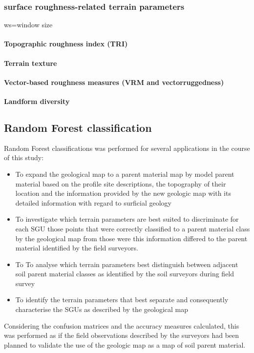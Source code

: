 \documentclass[preprint,12pt,authoryear]{elsarticle}
\begin{document}
\subsubsection{surface roughness-related terrain parameters}
ws=window size
\paragraph{Topographic roughness index (TRI)}  \citep{Riley1999}
\paragraph{Terrain texture}
\paragraph{Vector-based roughness measures (VRM and vectorruggedness)}
\paragraph{Landform diversity} 

\subsection{Random Forest classification }

Random Forest classifications was performed for several applications in the course of this study:
\begin{itemize}
\item To expand the geological map to a parent material map by model parent material based on the profile site descriptions, the topography of their location and the information provided by the new geologic map with its detailed information with regard to surficial geology
\item To investigate which terrain parameters are best suited to discriminate for each SGU those points that were correctly classified to a parent material class by the geological map from those were this information differed to the parent material identified by the field surveyors.
\item To To analyse which terrain parameters best distinguish between adjacent soil parent material classes as identified by the soil surveyors during field survey
\item To identify the terrain parameters that best separate and consequently characterise the SGUs as described by the geological map
\end{itemize}
Considering the confusion matrices and the accuracy measures calculated, this was performed as if the field observations described by the surveyors had been planned to validate the use of the geologic map as a map of soil parent material.
\end{document}
